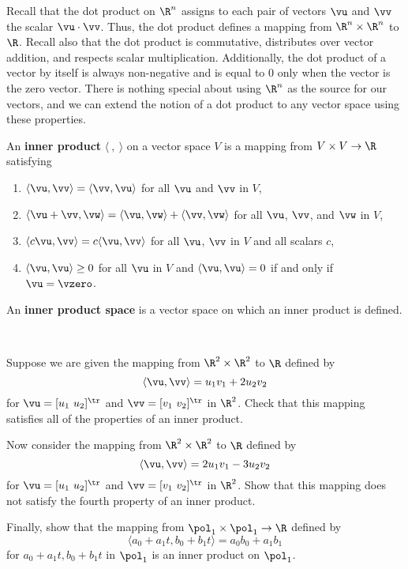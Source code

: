 Recall that the dot product on $\R^n$ assigns to each pair of vectors $\vu$ and $\vv$ the scalar $\vu \cdot \vv$. Thus, the dot product defines a mapping from $\R^n \times \R^n$ to $\R$. Recall also that the dot product is commutative, distributes over vector addition, and respects scalar multiplication. Additionally, the dot product of a vector by itself is always non-negative and is equal to 0 only when the vector is the zero vector. There is nothing special about using $\R^n$ as the source for our vectors, and we can extend the notion of a dot product to any vector space using these properties. 

\begin{definition} \label{def:6_c_inner_product}  An \textbf{inner product} $\langle \ , \ \rangle$ on a vector space $V$ is a mapping from $V \times V \to \R$ satisfying
\begin{enumerate}
\item $\langle \vu , \vv \rangle = \langle \vv , \vu \rangle$ for all $\vu$ and $\vv$ in $V$,
\item $\langle \vu + \vv , \vw \rangle = \langle \vu , \vw \rangle + \langle \vv , \vw \rangle$ for all $\vu$, $\vv$, and $\vw$ in $V$,
\item $\langle c\vu , \vv \rangle = c\langle \vu , \vv \rangle$ for all $\vu$, $\vv$ in $V$ and all scalars $c$,
\item $\langle \vu , \vu \rangle \geq 0$ for all $\vu$ in $V$ and $\langle \vu , \vu \rangle = 0$ if and only if $\vu = \vzero$.
\end{enumerate}
An \textbf{inner product space} is a vector space on which an inner product is defined.
\end{definition} 


\begin{pa} \label{pa:6_c} ~
\be
\item Suppose we are given the mapping from $\R^2 \times \R^2$ to $\R$ defined by
\[\langle \vu, \vv \rangle = u_1v_1 + 2u_2v_2\]
for $\vu = [u_1 \ u_2]^{\tr}$ and $\vv = [v_1 \ v_2]^{\tr}$ in $\R^2$. Check that this mapping satisfies all of the properties of an inner product.  \item 

\item Now consider the mapping from $\R^2 \times \R^2$ to $\R$ defined by 
\[\langle \vu, \vv \rangle = 2u_1v_1 - 3u_2v_2\]
for $\vu = [u_1 \ u_2]^{\tr}$ and $\vv = [v_1 \ v_2]^{\tr}$ in $\R^2$. Show that this mapping does not satisfy the fourth property of an inner product. 

\item Finally, show that the mapping from $\pol_1 \times \pol_1 \to \R$ defined by 
\[\langle a_0+a_1t, b_0+b_1t \rangle = a_0b_0 + a_1b_1\]
 for $a_0+a_1t, b_0+b_1t$ in $\pol_1$ is an inner product on $\pol_1$. 

\ee

\end{pa}

